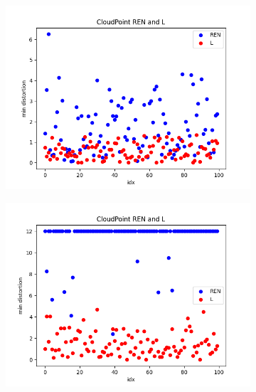 \documentclass[conference]{IEEEtran}
\begin{document}
\begin{figure}[htbp]
  \centering
  \begin{subfigure}[b]{0.15\textwidth}
    \includegraphics[width=\textwidth]
    {figures/experiment 2/pathtrack}
    \caption{}
  \end{subfigure}
  \hfill
  \begin{subfigure}[b]{0.15\textwidth}
    \includegraphics[width=\textwidth]
    {figures/experiment 2/pendulumstate}
    \caption{}
  \end{subfigure}
  \hfill
  \begin{subfigure}[b]{0.15\textwidth}

\end{subfigure}
\end{figure}
\end{document}
